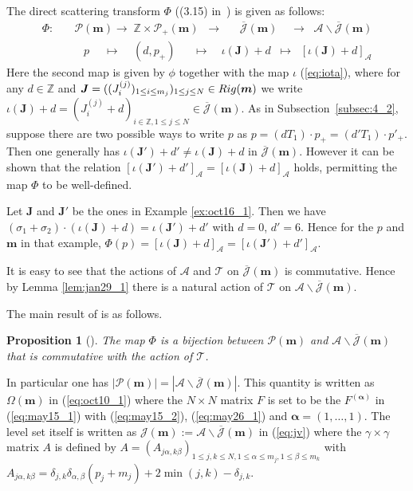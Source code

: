 \documentclass[11pt]{article}
\newtheorem{proposition}{Proposition}
\newcommand{\Z}{{\mathbb Z}}
\newcommand{\J}{{\mathcal J}}
\newcommand{\Jb}{{\overline{\mathcal J}}}
\newcommand{\Rig}{{\rm Rig}}
\newcommand{\Pth}{{\mathcal P}}
\newcommand\boa{\boldsymbol{\alpha}}
\newcommand{\m}{{\boldsymbol m}}
\newcommand{\boJ}{{\boldsymbol J}}
\begin{document}
The direct scattering transform $\Phi$ ((3.15) in~\cite{KTT}) is given as follows:
\begin{equation}\label{eq:pj}
\begin{split}
\Phi: \quad &\Pth(\m) \longrightarrow \;\Z \times \Pth_+(\m)\;\;
\longrightarrow \;\;\quad \Jb(\m) \;\;\;\;\longrightarrow
\;\; {{\mathcal A} \backslash \Jb (\m)}\\
&\;\;\;p \;\quad \longmapsto \;\;\;\;(d, p_+) \;\;\quad\longmapsto
\quad \iota(\boJ)+d \;\;\longmapsto \;\;[\iota(\boJ)+d]_{\mathcal A}
\end{split}
\end{equation}
Here the second map is given by $\phi$ together with the map $\iota$ {(\ref{eq:iota})}, where
for any $d \in \Z$ and $\boJ = ((J^{(j)}_i)_{1 \le i \le m_{j}})_{1 \leq j \leq N} \in \Rig(\m)$ we write
{$\iota (\boJ) + d = (J^{(j)}_i + d)_{i \in \Z, 1 \leq j \leq N} \in \Jb(\m)$}.
{As in Subsection~\ref{subsec:4_2},}
suppose there are two possible ways to write $p$ as  $p =(d T_1) \cdot p_+ = (d' T_1) \cdot p'_+$.
{Then one generally has $\iota(\boJ')+d' \ne \iota(\boJ)+d$ in $\Jb(\m)$.}
However it can be shown that the relation $[\iota(\boJ')+d']_{\mathcal A} = [\iota(\boJ)+d]_{\mathcal A}$
{holds}, permitting the map $\Phi$ to be well-def\/ined.
\begin{example}\label{ex:oct16_2}
Let $\boJ$ and $\boJ'$ be the ones in Example \ref{ex:oct16_1}.
Then we have
$(\sigma_1 + \sigma_2) \cdot (\iota (\boJ) + d) = \iota (\boJ') + d'$ with $d=0$, $d'=6$.
Hence for the $p$ and $\m$ in that example,
{$\Phi (p) = [\iota (\boJ) + d]_{\mathcal A} = [\iota (\boJ') + d']_{\mathcal A}$}.
\end{example}

It is easy to see that the actions of ${\mathcal A}$ and ${\mathcal T}$ on $\Jb(\m)$ is commutative.
Hence by Lemma \ref{lem:jan29_1} there is a natural action of ${\mathcal T}$ on ${\mathcal A} \backslash \Jb (\m)$.

The main result of \cite{KTT} is as follows.
\begin{proposition}[]\label{prop:ktt}
The map $\Phi$ is a bijection
between ${\mathcal P}(\m)$ and ${\mathcal A} \backslash \Jb (\m)$
that is commutative with the action of ${\mathcal T}$.
\end{proposition}


In particular one has $|{\mathcal P}(\m)| = |{\mathcal A} \backslash \Jb (\m)|$.
This quantity is written as $\Omega (\m)$ in (\ref{eq:oct10_1}) where the $N \times N$ matrix
$F$ is set to be the $F^{(\boa)}$ in (\ref{eq:may15_1}) with (\ref{eq:may15_2}), (\ref{eq:may26_1}) and
$\boa = (1,\ldots,1)$.
The level set itself is written as $\J (\m) {:= {\mathcal A} \backslash \Jb (\m)}$ in (\ref{eq:jv}) where the
$\gamma \times \gamma$ matrix $A$ is def\/ined by $A = (A_{j\alpha,k\beta})_{1 \leq j,k \leq N, 1 \leq \alpha \leq m_j, 1 \leq \beta \leq m_k}$
with
\begin{math}
A_{j\alpha,k\beta} = \delta_{j,k} \delta_{\alpha,\beta} (p_j + m_j) + 2 \min (j,k) - \delta_{j,k}.
\end{math}
\end{document}
